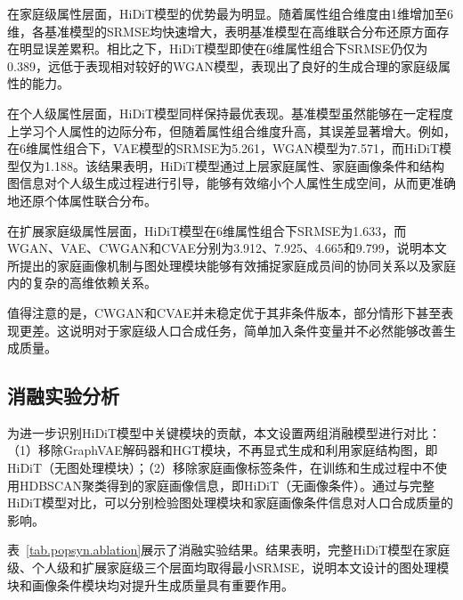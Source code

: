 在家庭级属性层面，HiDiT模型的优势最为明显。随着属性组合维度由1维增加至6维，各基准模型的SRMSE均快速增大，表明基准模型在高维联合分布还原方面存在明显误差累积。相比之下，HiDiT模型即使在6维属性组合下SRMSE仍仅为0.389，远低于表现相对较好的WGAN模型，表现出了良好的生成合理的家庭级属性的能力。

在个人级属性层面，HiDiT模型同样保持最优表现。基准模型虽然能够在一定程度上学习个人属性的边际分布，但随着属性组合维度升高，其误差显著增大。例如，在6维属性组合下，VAE模型的SRMSE为5.261，WGAN模型为7.571，而HiDiT模型仅为1.188。该结果表明，HiDiT模型通过上层家庭属性、家庭画像条件和结构图信息对个人级生成过程进行引导，能够有效缩小个人属性生成空间，从而更准确地还原个体属性联合分布。

在扩展家庭级属性层面，HiDiT模型在6维属性组合下SRMSE为1.633，而WGAN、VAE、CWGAN和CVAE分别为3.912、7.925、4.665和9.799，说明本文所提出的家庭画像机制与图处理模块能够有效捕捉家庭成员间的协同关系以及家庭内的复杂的高维依赖关系。

值得注意的是，CWGAN和CVAE并未稳定优于其非条件版本，部分情形下甚至表现更差。这说明对于家庭级人口合成任务，简单加入条件变量并不必然能够改善生成质量。

\subsection{消融实验分析}\label{subsec.popsyn.experiment.ablation}

为进一步识别HiDiT模型中关键模块的贡献，本文设置两组消融模型进行对比：（1）移除GraphVAE解码器和HGT模块，不再显式生成和利用家庭结构图，即HiDiT（无图处理模块）；（2）移除家庭画像标签条件，在训练和生成过程中不使用HDBSCAN聚类得到的家庭画像信息，即HiDiT（无画像条件）。通过与完整HiDiT模型对比，可以分别检验图处理模块和家庭画像条件信息对人口合成质量的影响。

表~\ref{tab.popsyn.ablation}展示了消融实验结果。结果表明，完整HiDiT模型在家庭级、个人级和扩展家庭级三个层面均取得最小SRMSE，说明本文设计的图处理模块和画像条件模块均对提升生成质量具有重要作用。


